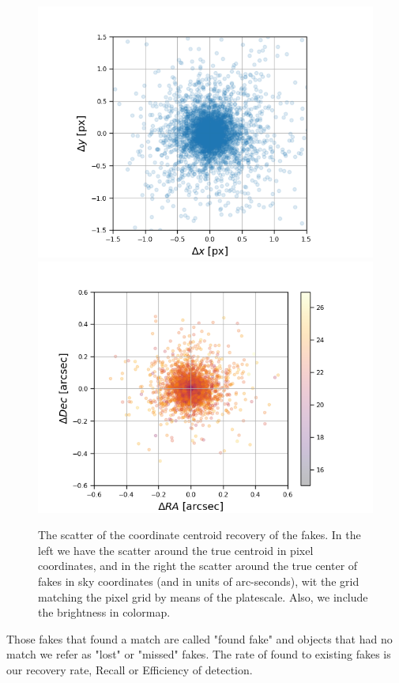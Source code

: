 \begin{figure}
    \centering
    \includegraphics[width=0.49\linewidth]{dia/figures/scatter_xy_diaSrcs_match_px.png}
    \includegraphics[width=0.49\linewidth]{dia/figures/scatter_radec_diaSrcs_match_arsec_mag.png}
    \caption{The scatter of the coordinate centroid recovery of the fakes. In the left we have the scatter around the true centroid in pixel coordinates, and in the right the scatter around the true center of fakes in sky coordinates (and in units of arc-seconds), wit the grid matching the pixel grid by means of the platescale. Also, we include the brightness in colormap.}
    \label{fig:scatter_radec_diaSrcs_match_arsec_mag}
\end{figure}

Those fakes that found a match are called "found fake" and objects that had no match we refer as "lost" or "missed" fakes. 
The rate of found to existing fakes is our recovery rate, Recall or Efficiency of detection. 

